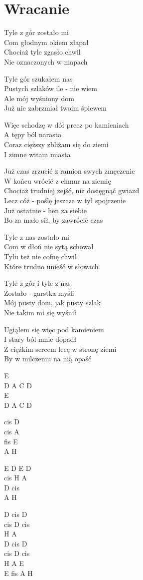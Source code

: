 \section{Wracanie}
\begin{text}
Tyle z gór zostało mi\\
Com głodnym okiem złapał\\
Chociaż tyle zgasło chwil\\
Nie oznaczonych w mapach

Tyle gór szukałem nas\\
Pustych szlaków ile - nie wiem\\
Ale mój wyśniony dom\\
Już nie zabrzmiał twoim śpiewem

Więc schodzę w dół precz po kamieniach\\
A tępy ból narasta\\
Coraz cięższy zbliżam się do ziemi\\
I zimne witam miasta

Już czas zrzucić z ramion swych zmęczenie\\
W końcu wrócić z chmur na ziemię\\
Chociaż trudniej zejść, niż dosięgnąć gwiazd\\
Lecz cóż - poślę jeszcze w tył spojrzenie\\
Już ostatnie - hen za siebie\\
Bo za mało sił, by zawrócić czas

Tyle z nas zostało mi\\
Com w dłoń nie sytą schował\\
Tylu też nie cofnę chwil\\
Które trudno unieść w słowach

Tyle z gór i tyle z nas\\
Zostało - garstka myśli\\
Mój pusty dom, jak pusty szlak\\
Nie takim mi się wyśnił

Ugiąłem się więc pod kamieniem\\
I stary ból mnie dopadł\\
Z ciężkim sercem lecę w stronę ziemi\\
By w milczeniu na nią opaść
\end{text}
\begin{chord}
    E\\
    D A C D\\
    E\\
    D A C D

    cis D\\
    cis A\\
    fis E\\
    A H

    E D E D\\
    cis H A\\
    D cis\\
    A H

    D cis D\\
    cis D cis\\
    H A\\
    D cis D\\
    cis D cis\\
    H A E\\
    E fis A H
\end{chord}